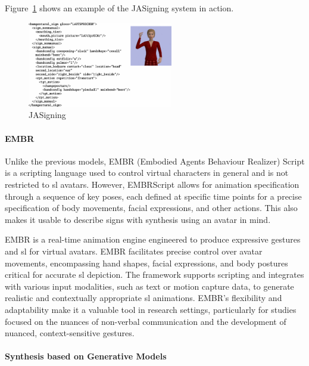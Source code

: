 \documentclass[../../main.tex]{subfiles}
\begin{document}
Figure~\ref{fig:jasigning} shows an example of the JASigning system in action.

\begin{figure} 
  \centering \includegraphics[width = 2.5in]{chapters/background_work/images/jasigning.png} 
  \caption{JASigning} 
  \label{fig:jasigning} 
\end{figure}

\paragraph{EMBR}
\label{ch:background_work:sign_language_synthesis:3d_techniques:sign_language_synthesis_systems:embr}

Unlike the previous models, EMBR (Embodied Agents Behaviour Realizer) Script is a scripting language used to control virtual characters in general and is not restricted to \gls{sl} avatars. However, EMBRScript allows for animation specification through a sequence of key poses, each defined at specific time points for a precise specification of body movements, facial expressions, and other actions. This also makes it usable to describe signs with synthesis using an avatar in mind.

EMBR is a real-time animation engine engineered to produce expressive gestures and \gls{sl} for virtual avatars. EMBR facilitates precise control over avatar movements, encompassing hand shapes, facial expressions, and body postures critical for accurate \gls{sl} depiction. The framework supports scripting and integrates with various input modalities, such as text or motion capture data, to generate realistic and contextually appropriate \gls{sl} animations. EMBR's flexibility and adaptability make it a valuable tool in research settings, particularly for studies focused on the nuances of non-verbal communication and the development of nuanced, context-sensitive gestures.

\paragraph{Synthesis based on Generative Models}
\label{ch:background_work:sign_language_synthesis:3d_techniques:sign_language_synthesis_systems:synthesis_based_on_generative_models}
\end{document}
